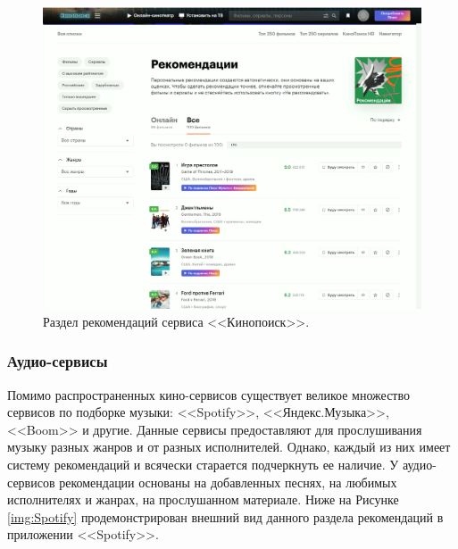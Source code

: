 \begin{figure}[h!]
	\centering
	\includegraphics[scale=0.5]{img/kinopoisk.png}
	\caption{Раздел рекомендаций сервиса <<Кинопоиск>>.}
	\label{img:kinopoisk}
\end{figure}  

\newpage
\subsubsection{Аудио-сервисы}
Помимо распространенных кино-сервисов существует великое множество сервисов по подборке музыки: <<Spotify>>, <<Яндекс.Музыка>>, <<Boom>> и другие. Данные сервисы предоставляют для прослушивания музыку разных жанров и от разных исполнителей. Однако, каждый из них имеет систему рекомендаций и всячески старается подчеркнуть ее наличие. У аудио-сервисов рекомендации основаны на добавленных песнях, на любимых исполнителях и жанрах, на прослушанном материале. Ниже на Рисунке \ref{img:Spotify} продемонстрирован внешний вид данного раздела рекомендаций в приложении <<Spotify>>.

